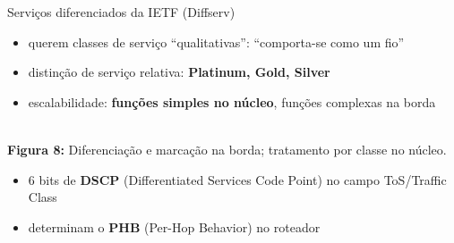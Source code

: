 \documentclass[aspectratio=169,11pt]{beamer}
\begin{document}
\begin{frame}{Serviços diferenciados da IETF (Diffserv)}
  \begin{itemize}
    \item querem classes de serviço ``qualitativas'': ``comporta-se como um fio''
    \item distinção de serviço relativa: \textbf{Platinum, Gold, Silver}
    \item escalabilidade: \textbf{funções simples no núcleo}, funções complexas na borda
  \end{itemize}
  \pause
  \begin{center}
    \\[1mm]
    {\scriptsize \textbf{Figura 8:} Diferenciação e marcação na borda; tratamento por classe no núcleo.}
  \end{center}
  \begin{itemize}
    \item 6 bits de \textbf{DSCP} (Differentiated Services Code Point) no campo ToS/Traffic Class
    \item determinam o \textbf{PHB} (Per-Hop Behavior) no roteador
  \end{itemize}
\end{frame}
\end{document}
